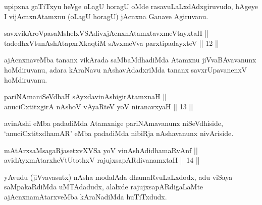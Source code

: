 \begin{artha}
upipxna gaTiTxyu heVge oLagU horagU oMde rasavuLaLxdAdxgiruvudo, hAgeye I vijAcnxnAtamxnu (oLagU horagU) jAcnxna Ganave Agiruvanu.
\end{artha}


\begin{shl}
savxvikAroVpasaMshelxVSAdivxjAcnxnAtamxtavxmeVtayxtaH || \\
tadedhxVtunAshAtapxrXkaqtiM sAvxmeVva parxtipadayxteV ||  12 ||  
\end{shl}

\begin{artha}
ajAcnxnaveMba tananx vikArada saMbaMdhadiMda Atamxnu jiVvaBAvavanunx hoMdiruvanu, adara kAraNavu nAshavAdadxriMda tananx savxrUpavanenxV hoMdiruvanu.
\end{artha}


\begin{shl}
pariNAmaniSeVdhaH sAyxdavinAshigirA\s \s tamxnaH || \\
anuciCxtitxgirA nAshoV vAyaRteV yoV niranavxyaH ||  13 ||  
\end{shl}	

\begin{artha}
avinAshi eMba padadiMda Atamxnige pariNAmavanunx niSeVdhiside, `anuciCxtitxdhamAR' eMba padadiMda nibiRja nAshavanunx nivAriside.
\end{artha}


\begin{shl}
mAtArxsaMsagaRjasetxvXVSa yoV vinAshAdidhamaRvAnf ||  \\
avidAyxmAtarxheVtUtothxV rajujxsapARdivanamxtaH ||  14 ||  
\end{shl}

\begin{artha}
yAvudu (jiVvavasutx) nAsha modalAda dhamaRvuLaLxdodx, adu viSaya saMpakaRdiMda uMTAdadudx, alalxde rajujxsapARdigaLaMte ajAcnxnamAtarxveMba kAraNadiMda huTiTxdudx.
\end{artha}


